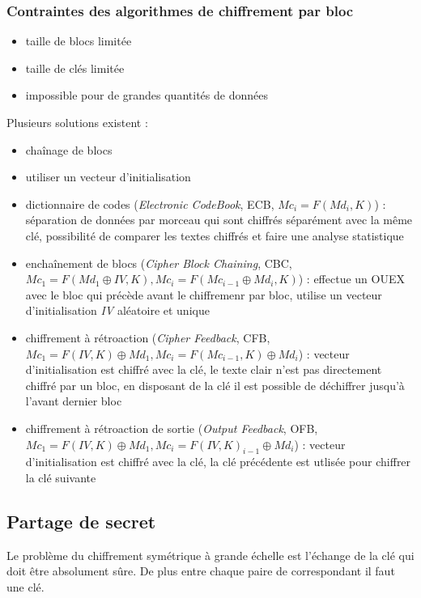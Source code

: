 \documentclass[12pt, a4paper]{article}
\begin{document}
	\subsubsection{Contraintes des algorithmes de chiffrement par bloc}
	\begin{itemize}
		\item taille de blocs limitée
		\item taille de clés limitée
		\item impossible pour de grandes quantités de données
	\end{itemize}
	Plusieurs solutions existent :
	\begin{itemize}
		\item chaînage de blocs
		\item utiliser un vecteur d'initialisation
		\item dictionnaire de codes (\textit{Electronic CodeBook}, ECB, $Mc_{i} =
		F(Md_{i}, K)$) : séparation de données par morceau qui sont chiffrés
		séparément avec la même clé, possibilité de comparer les textes chiffrés et
		faire une analyse statistique
		\item enchaînement de blocs (\textit{Cipher Block Chaining}, CBC, $Mc_{1} =
		F(Md_{1} \oplus IV, K), Mc_{i} = F(Mc_{i-1} \oplus Md_{i}, K)$) : effectue
		un OUEX avec le bloc qui précède avant le chiffremenr par bloc, utilise un
		vecteur d'initialisation \textit{IV} aléatoire et unique
		\item chiffrement à rétroaction (\textit{Cipher Feedback}, CFB, $Mc_{1} =
		F(IV, K) \oplus Md_{1}, Mc_{i} = F(Mc_{i-1}, K) \oplus Md_{i}$) : vecteur
		d'initialisation est chiffré avec la clé, le texte clair n'est pas
		directement chiffré par un bloc, en disposant de la clé il est possible de
		déchiffrer jusqu'à l'avant dernier bloc
		\item chiffrement à rétroaction de sortie (\textit{Output Feedback}, OFB,
		$Mc_{1} = F(IV, K) \oplus Md_{1}, Mc_{i} = F(IV, K)_{i-1} \oplus Md_{i}$) :
		vecteur d'initialisation est chiffré avec la clé, la clé précédente est
		utlisée pour chiffrer la clé suivante
	\end{itemize}
	\subsection{Partage de secret}
	Le problème du chiffrement symétrique à grande échelle est l'échange de la
	clé qui doit être absolument sûre. De plus entre chaque paire de correspondant
	 il faut une clé.
\end{document}
